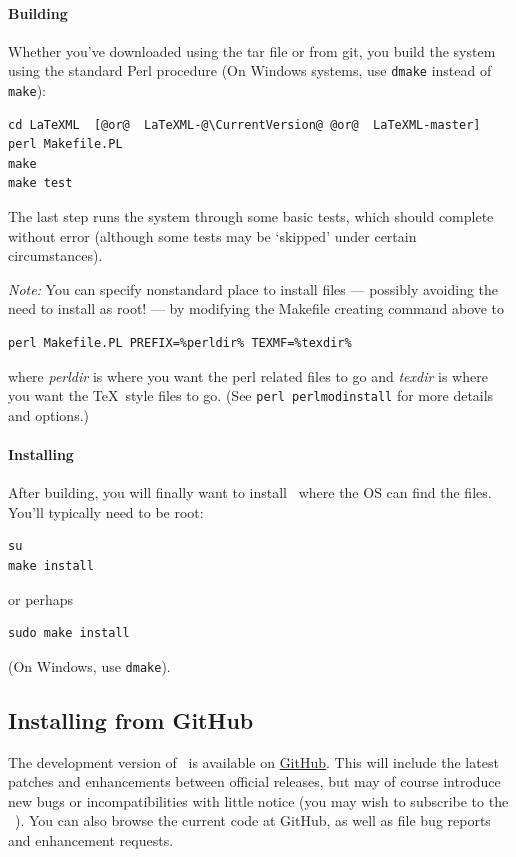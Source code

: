 \documentclass{article}
\begin{document}
\paragraph{Building}\label{build.source}
Whether you've downloaded using the tar file or from git,
you build the system using the standard Perl procedure
(On Windows systems, use \texttt{dmake} instead of \texttt{make}):
\begin{lstlisting}[style=shell]
cd LaTeXML  [@or@  LaTeXML-@\CurrentVersion@ @or@  LaTeXML-master]
perl Makefile.PL
make
make test
\end{lstlisting}
The last step runs the system through some basic tests,
which should complete without error (although some tests may be `skipped'
under certain circumstances).


\emph{Note:} You can specify nonstandard place to install files
--- possibly avoiding the need to install as root! ---
by modifying the Makefile creating command above to
\begin{lstlisting}[style=shell]
perl Makefile.PL PREFIX=%perldir% TEXMF=%texdir%
\end{lstlisting}
where \emph{perldir} is where you want the perl related files to go and
\emph{texdir} is where you want the \TeX\ style files to go.
(See \texttt{perl perlmodinstall} for more details and options.)

\paragraph{Installing}\label{install.source}
After building, you will finally want to install \LaTeXML\ where the OS can find the files.  
You'll typically need to be root:
\begin{lstlisting}[style=shell]
su
make install
\end{lstlisting}
or perhaps
\begin{lstlisting}[style=shell]
sudo make install
\end{lstlisting}
(On Windows, use \texttt{dmake}).

\subsection{Installing from GitHub}\label{install.github}
The development version of \LaTeXML\ is available on  \href{https://github.com}{GitHub}.
This will include the latest patches and enhancements between official releases,
but may of course introduce new bugs or incompatibilities with little notice
(you may wish to subscribe to the \LaTeXML\ ).
You can also browse the current code at GitHub, as well as file bug reports and enhancement requests.
\end{document}
